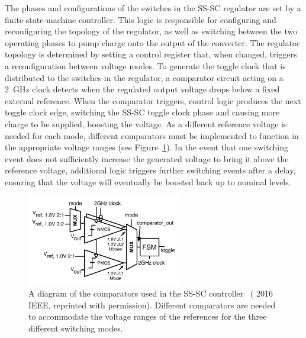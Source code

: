 \documentclass[graybox]{svmult}
\begin{document}
The phases and configurations of the switches in the SS-SC regulator are set by a finite-state-machine controller.
This logic is responsible for configuring and reconfiguring the topology of the regulator, as well as switching between the two operating phases to pump charge onto the output of the converter.
The regulator topology is determined by setting a control register that, when changed, triggers a reconfiguration between voltage modes.
To generate the toggle clock that is distributed to the switches in the regulator, a comparator circuit acting on a \SI{2}{\GHz} clock detects when the regulated output voltage drops below a fixed external reference.
When the comparator triggers, control logic produces the next toggle clock edge, switching the SS-SC toggle clock phase and causing more charge to be supplied, boosting the voltage.
As a different reference voltage is needed for each mode, different comparators must be implemented to function in the appropriate voltage ranges (see Figure~\ref{fig:3-dcdc-comparators}).
In the event that one switching event does not sufficiently increase the generated voltage to bring it above the reference voltage, additional logic triggers further switching events after a delay, ensuring that the voltage will eventually be boosted back up to nominal levels.

\begin{figure}
  \centering
  \includegraphics[width=0.6\textwidth]{3-dcdc-comparators}
  \caption{A diagram of the comparators used in the SS-SC controller~\cite{Zimmer2016} ({\textcopyright} 2016 IEEE, reprinted with permission).  Different comparators are needed to accommodate the voltage ranges of the references for the three different switching modes.}
  \label{fig:3-dcdc-comparators}
\end{figure}

\end{document}
